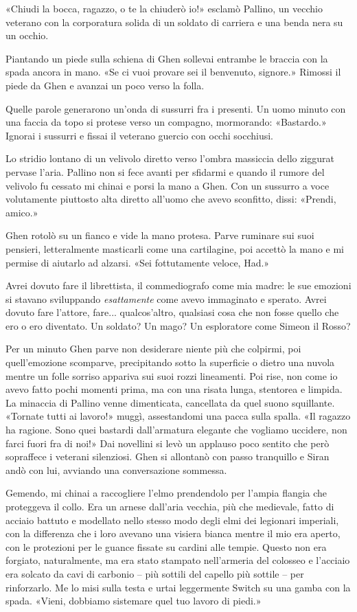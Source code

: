 «Chiudi la bocca, ragazzo, o te la chiuderò io!» esclamò Pallino, un
vecchio veterano con la corporatura solida di un soldato di carriera e
una benda nera su un occhio.

Piantando un piede sulla schiena di Ghen sollevai entrambe le braccia
con la spada ancora in mano. «Se ci vuoi provare sei il benvenuto,
signore.» Rimossi il piede da Ghen e avanzai un poco verso la folla.

Quelle parole generarono un'onda di sussurri fra i presenti. Un uomo
minuto con una faccia da topo si protese verso un compagno, mormorando:
«Bastardo.» Ignorai i sussurri e fissai il veterano guercio con occhi
socchiusi.

Lo stridio lontano di un velivolo diretto verso l'ombra massiccia dello
ziggurat pervase l'aria. Pallino non si fece avanti per sfidarmi e
quando il rumore del velivolo fu cessato mi chinai e porsi la mano a
Ghen. Con un sussurro a voce volutamente piuttosto alta diretto all'uomo
che avevo sconfitto, dissi: «Prendi, amico.»

Ghen rotolò su un fianco e vide la mano protesa. Parve ruminare sui suoi
pensieri, letteralmente masticarli come una cartilagine, poi accettò la
mano e mi permise di aiutarlo ad alzarsi. «Sei fottutamente veloce,
Had.»

Avrei dovuto fare il librettista, il commediografo come mia madre: le
sue emozioni si stavano sviluppando \emph{esattamente} come avevo
immaginato e sperato. Avrei dovuto fare l'attore, fare... qualcos'altro,
qualsiasi cosa che non fosse quello che ero o ero diventato. Un soldato?
Un mago? Un esploratore come Simeon il Rosso?

Per un minuto Ghen parve non desiderare niente più che colpirmi, poi
quell'emozione scomparve, precipitando sotto la superficie o dietro una
nuvola mentre un folle sorriso appariva sui suoi rozzi lineamenti. Poi
rise, non come io avevo fatto pochi momenti prima, ma con una risata
lunga, stentorea e limpida. La minaccia di Pallino venne dimenticata,
cancellata da quel suono squillante. «Tornate tutti ai lavoro!» muggì,
assestandomi una pacca sulla spalla. «Il ragazzo ha ragione. Sono quei
bastardi dall'armatura elegante che vogliamo uccidere, non farci fuori
fra di noi!» Dai novellini si levò un applauso poco sentito che però
sopraffece i veterani silenziosi. Ghen si allontanò con passo tranquillo
e Siran andò con lui, avviando una conversazione sommessa.

Gemendo, mi chinai a raccogliere l'elmo prendendolo per l'ampia flangia
che proteggeva il collo. Era un arnese dall'aria vecchia, più che
medievale, fatto di acciaio battuto e modellato nello stesso modo degli
elmi dei legionari imperiali, con la differenza che i loro avevano una
visiera bianca mentre il mio era aperto, con le protezioni per le guance
fissate su cardini alle tempie. Questo non era forgiato, naturalmente,
ma era stato stampato nell'armeria del colosseo e l'acciaio era solcato
da cavi di carbonio -- più sottili del capello più sottile -- per
rinforzarlo. Me lo misi sulla testa e urtai leggermente Switch su una
gamba con la spada. «Vieni, dobbiamo sistemare quel tuo lavoro di
piedi.»

